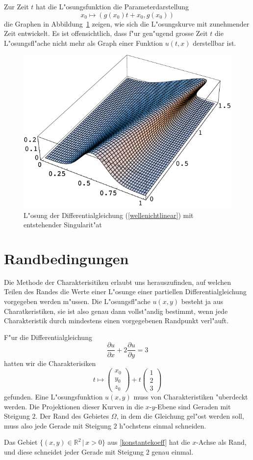 Zur Zeit $t$ hat die L"osungsfunktion die Parameterdarstellung
\[
x_0\mapsto (g(x_0)t+x_0,g(x_0))
\]
die Graphen in Abbildung~\ref{g} zeigen, wie sich die L"osungskurve
mit zunehmender Zeit entwickelt.
Es ist offensichtlich, dass f"ur gen"ugend grosse Zeit $t$ die
L"osungsfl"ache nicht mehr als Graph einer Funktion $u(t,x)$ derstellbar ist.
\begin{figure}
\begin{center}
\includegraphics[width=\hsize]{graphics/welle}
\end{center}
\caption{L"osung der Differentialgleichung (\ref{wellenichtlinear}) mit
entstehender Singularit"at\label{g}}
\end{figure}

\section{Randbedingungen}
Die Methode der Charakterisitiken erlaubt uns herauszufinden, auf welchen
Teilen des Randes die Werte einer L"osunge einer partiellen
Differentialgleichung vorgegeben werden m"ussen.
Die L"osungsfl"ache $u(x,y)$ besteht ja aus Charatkeristiken, sie ist also
genau dann vollst"andig bestimmt, wenn jede Charakteristik durch mindestens 
einen vorgegebenen Randpunkt verl"auft.

F"ur die Differentialgleichung
\[
\frac{\partial u}{\partial x}+2\frac{\partial u}{\partial y}=3
\]
hatten wir die Charakterisiken 
\[
t\mapsto\begin{pmatrix}x_0\\y_0\\z_0\end{pmatrix}+t\begin{pmatrix}1\\2\\3\end{pmatrix}
\]
gefunden. Eine L"osungsfunktion $u(x,y)$ muss von Charakteristiken
"uberdeckt werden. 
Die Projektionen dieser Kurven in die $x$-$y$-Ebene sind Geraden
mit Steigung $2$. Der Rand des Gebietes $\Omega$, in dem die Gleichung gel"ost
werden soll, muss also jede Gerade mit Steigung $2$ h"ochstens einmal
schneiden.

Das Gebiet $\{(x,y)\in\mathbb R^2\,|\, x >0\}$  aus \ref{konstantekoeff}
hat die $x$-Achse als Rand, und diese schneidet jeder Gerade mit Steigung
$2$ genau einmal.
